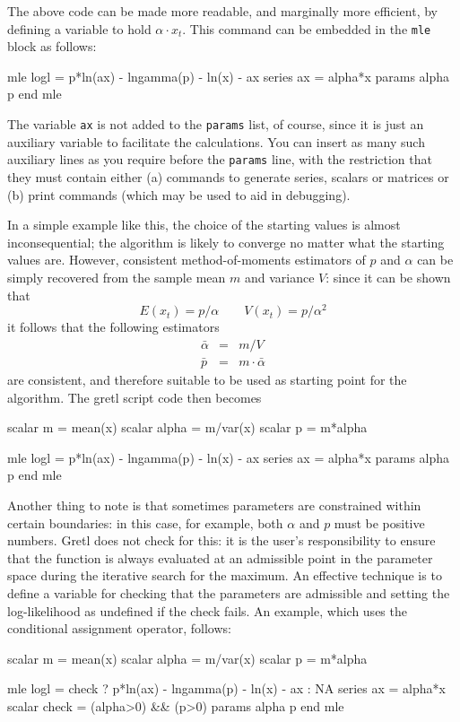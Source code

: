 The above code can be made more readable, and marginally more
efficient, by defining a variable to hold $\alpha \cdot x_t$. This
command can be embedded in the \texttt{mle} block as follows:
\begin{code}
mle logl =  p*ln(ax) - lngamma(p) - ln(x) - ax 
  series ax = alpha*x
  params alpha p
end mle 
\end{code}
The variable \texttt{ax} is not added to the \texttt{params} list,
of course, since it is just an auxiliary variable to facilitate
the calculations.  You can insert as many such auxiliary lines
as you require before the \texttt{params} line, with the restriction
that they must contain either (a) commands to generate series,
scalars or matrices or (b) print commands (which may be used to
aid in debugging).

In a simple example like this, the choice of the starting values is
almost inconsequential; the algorithm is likely to converge no
matter what the starting values are. However, consistent
method-of-moments estimators of $p$ and $\alpha$ can be simply
recovered from the sample mean $m$ and variance $V$: since it can be
shown that
\[
  E(x_t) = p/\alpha \qquad  V(x_t) = p/\alpha^2
\]
it follows that the following estimators 
\begin{eqnarray*}
  \bar{\alpha} & = &  m/V \\
  \bar{p} & = & m \cdot \bar{\alpha} 
\end{eqnarray*}
are consistent, and therefore suitable to be used as starting point
for the algorithm.  The gretl script code then becomes
\begin{code}
scalar m = mean(x)
scalar alpha = m/var(x)
scalar p = m*alpha

mle logl =  p*ln(ax) - lngamma(p) - ln(x) - ax 
  series ax = alpha*x
  params alpha p
end mle 
\end{code}

Another thing to note is that sometimes parameters are constrained
within certain boundaries: in this case, for example, both $\alpha$
and $p$ must be positive numbers. Gretl does not check for this:
it is the user's responsibility to ensure that the function is
always evaluated at an admissible point in the parameter space during
the iterative search for the maximum. An effective technique is to
define a variable for checking that the parameters are admissible and
setting the log-likelihood as undefined if the check fails. An
example, which uses the conditional assignment operator, follows:
\begin{code}
scalar m = mean(x)
scalar alpha = m/var(x)
scalar p = m*alpha

mle logl = check ? p*ln(ax) - lngamma(p) - ln(x) - ax : NA
  series ax = alpha*x
  scalar check = (alpha>0) && (p>0)
  params alpha p
end mle 
\end{code}

